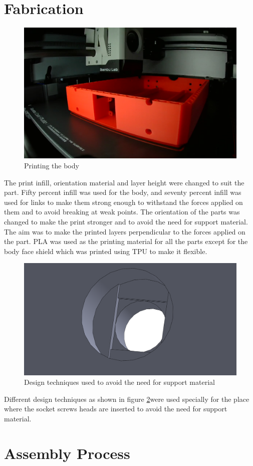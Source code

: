 \section{Fabrication}
\begin{figure}[h]
	\centering
	\includegraphics[width=0.7\linewidth]{body_printing}
	\caption{Printing the body}
	\label{fig:bodyprinting}
\end{figure}
The print infill, orientation material and layer height were changed to suit the part.
Fifty percent infill was used for the body, and seventy percent infill was used for links to make them strong enough to withstand the forces applied on them and to avoid breaking at weak points.
The orientation of the parts was changed to make the print stronger and to avoid the need for support material.
The aim was to make the printed layers perpendicular to the forces applied on the part.
PLA was used as the printing material for all the parts except for the body face shield which was printed using TPU to make it flexible.
\begin{figure}[h]
	\centering
	\includegraphics[width=0.5\linewidth]{screw_head_fitting}
	\caption{Design techniques used to avoid the need for support material}
	\label{fig:Screw head fitting}
\end{figure}
Different design techniques as shown in figure \ref{fig:Screw head fitting}were used specially for the place where the socket screws heads are inserted to avoid the need for support material.
\section{Assembly Process}
